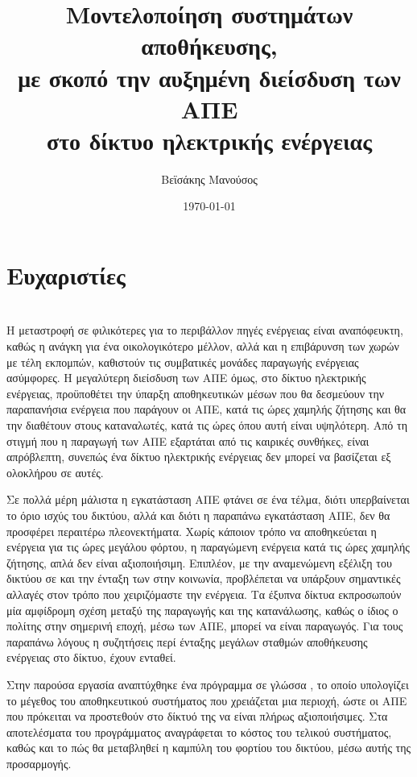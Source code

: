 \documentclass[12pt]{report}
\author{Βεϊσάκης Μανούσος}
\title{Μοντελοποίηση συστημάτων αποθήκευσης, \\με σκοπό την αυξημένη διείσδυση των ΑΠΕ \\στο δίκτυο ηλεκτρικής ενέργειας}
\date{\today}
\begin{document}
\maketitle
\tableofcontents
\chapter*{Ευχαριστίες}
\chapter*{{}}
Η μεταστροφή σε φιλικότερες για το περιβάλλον πηγές ενέργειας είναι αναπόφευκτη, καθώς η ανάγκη για ένα οικολογικότερο μέλλον, αλλά και η επιβάρυνση των χωρών με τέλη εκπομπών, καθιστούν τις συμβατικές μονάδες παραγωγής ενέργειας
ασύμφορες. Η μεγαλύτερη διείσδυση των ΑΠΕ όμως, στο δίκτυο ηλεκτρικής ενέργειας, προϋποθέτει την ύπαρξη αποθηκευτικών μέσων που θα δεσμεύουν την παραπανήσια ενέργεια που παράγουν οι ΑΠΕ, κατά τις ώρες χαμηλής ζήτησης και θα την 
διαθέτουν στους καταναλωτές, κατά τις ώρες όπου αυτή είναι υψηλότερη. Από τη στιγμή που η παραγωγή των ΑΠΕ εξαρτάται από τις καιρικές συνθήκες, είναι απρόβλεπτη, συνεπώς ένα δίκτυο ηλεκτρικής ενέργειας δεν μπορεί να βασίζεται 
εξ ολοκλήρου σε αυτές.

Σε πολλά μέρη μάλιστα η εγκατάσταση ΑΠΕ φτάνει σε ένα τέλμα, διότι υπερβαίνεται το όριο ισχύς του δικτύου, αλλά και διότι η παραπάνω εγκατάσταση ΑΠΕ, δεν θα προσφέρει περαιτέρω πλεονεκτήματα. Χωρίς κάποιον τρόπο να αποθηκεύεται
η ενέργεια για τις ώρες μεγάλου φόρτου, η παραγώμενη ενέργεια κατά τις ώρες χαμηλής ζήτησης, απλά δεν είναι αξιοποιήσιμη. Επιπλέον, με την αναμενώμενη εξέλιξη του δικτύου σε {} και την ένταξη των 
{} στην κοινωνία, προβλέπεται να υπάρξουν σημαντικές αλλαγές στον τρόπο που χειριζόμαστε την ενέργεια. Τα έξυπνα δίκτυα εκπροσωπούν μία αμφίδρομη σχέση μεταξύ της παραγωγής και της κατανάλωσης, καθώς ο ίδιος ο 
πολίτης στην σημερινή εποχή, μέσω των ΑΠΕ, μπορεί να είναι παραγωγός. Για τους παραπάνω λόγους η συζητήσεις περί ένταξης μεγάλων σταθμών αποθήκευσης ενέργειας στο δίκτυο, έχουν ενταθεί. 

Στην παρούσα εργασία αναπτύχθηκε ένα πρόγραμμα σε γλώσσα {}, το οποίο υπολογίζει το μέγεθος του αποθηκευτικού συστήματος που χρειάζεται μια περιοχή, ώστε οι ΑΠΕ που πρόκειται να προστεθούν στο δίκτυό της να είναι
πλήρως αξιοποιήσιμες. Στα αποτελέσματα του προγράμματος αναγράφεται το κόστος του τελικού συστήματος, καθώς και το πώς θα μεταβληθεί η καμπύλη του φορτίου του δικτύου, μέσω αυτής της προσαρμογής.
\end{document}
